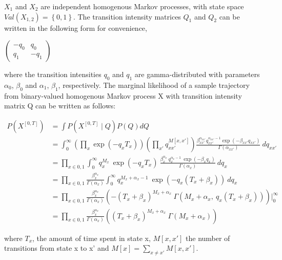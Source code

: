 \documentclass[]{article}
\begin{document}
	$ X_{1} $ and $ X_{2} $ are independent homogenous Markov processes, with state space $ Val(X_{1, 2}) = \left\lbrace 0, 1 \right\rbrace $. The transition intensity matrices $ Q_{1} $ and $ Q_{2} $ can be written in the following form for convenience,
	\begin{center}
		\begin{math}
		\begin{pmatrix}
		-q_{0} & q_{0} \\
		q_{1} & -q_{1}
		\end{pmatrix}
		\end{math}\\
	\end{center}
	where the transition intensities $ q_{0} $ and $ q_{1} $ are gamma-distributed with parameters $ \alpha_{0}$, $ \beta_{0} $ and $ \alpha_{1} $, $ \beta_{1} $, respectively. The marginal likelihood of a sample trajectory from binary-valued homogenous Markov process X with transition intensity matrix Q can be written as follows:
	
	\begin{align}
	P(X^{[0, T]}) & = \int  P(X^{[0, T]}\mid Q)P(Q) dQ \\ & = \int_{0}^{\infty} \left( \prod_{x} \exp(-q_{x}T_{x}) \right) \left( \prod_{x'} q_{xx'}^{M[x, x']}\right) \frac{\beta_{xx'}^{\alpha_{xx'}}{q_{xx'}^{\alpha_{xx'}-1}}\exp(-\beta_{xx'}q_{xx'})}{\Gamma(\alpha_{xx'})} \ dq_{xx'} \\ & = \prod_{x\in{0,1}}\int_{0}^{\infty} q_{x}^{M_{x}} \ \exp(-q_{x}T_{x}) \  \frac{\beta_{x}^{\alpha_{x}} \ q_{x}^{\alpha_{x}-1}\ \exp(-\beta_{x}q_{x})}{\Gamma(\alpha_{x})} \ dq_{x} \\ & = \prod_{x\in{0,1}} \frac{\beta_{x}^{\alpha_{x}}}{\Gamma(\alpha_{x})} \int_{0}^{\infty} q_{x}^{M_{x} + \alpha_{x} -1} \ \exp(-q_{x}(T_{x}+\beta_{x})) \ dq_{x} \\ & = \prod_{x\in{0,1}} \frac{\beta_{x}^{\alpha_{x}}}{\Gamma(\alpha_{x})} \left( -(T_{x}+\beta_{x})^{M_{x} + \alpha_{x}}\ \Gamma(M_{x} + \alpha_{x}, \ q_{x}(T_{x}+\beta_{x})) \right) \Big|_0^\infty  \\ & = \prod_{x\in{0,1}} \frac{\beta_{x}^{\alpha_{x}}}{\Gamma(\alpha_{x})} \left( (T_{x}+\beta_{x})^{M_{x} + \alpha_{x}}\ \Gamma(M_{x} + \alpha_{x}) \right)
	\label{eq:Marg_traj}
	\end{align}
	
	where $ T_{x} $, the amount of time spent in state x, $ M[x,x'] $ the number of transitions from state x to x' and  $ M[x] = \sum_{x\neq x'}M[x,x'] $.\\
	
\end{document}

